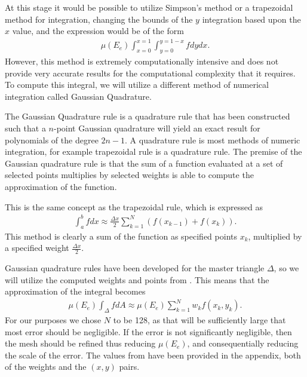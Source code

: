 \documentclass[../fem.tex]{subfile}
\begin{document}
At this stage it would be possible to utilize Simpson's method or a trapezoidal
method for integration, changing the bounds of the $y$ integration based upon
the $x$ value, and the expression would be of the form
\begin{align*}
  \mu\left(E_e\right)\int_{x=0}^{x=1}\int_{y=0}^{y=1-x}fdydx.
\end{align*}
However, this method is extremely computationally intensive and does not
provide very accurate results for the computational complexity that it
requires. To compute this integral, we will utilize a different method of
numerical integration called Gaussian Quadrature.

The Gaussian Quadrature rule is a quadrature rule that has been constructed
such that a $n$-point Gaussian quadrature will yield an exact result for
polynomials of the degree $2n-1$. A quadrature rule is most methods of numeric
integration, for example trapezoidal rule is a quadrature rule. The premise of
the Gaussian quadrature rule is that the sum of a function evaluated at a set
of selected points multiplies by selected weights is able to compute the
approximation of the function.

This is the same concept as the trapezoidal rule, which is expressed as
\begin{align*}
  \int_a^bfdx\approx\frac{\Delta
    x}{2}\sum_{k=1}^{N}\left(f(x_{k-1})+f(x_{k})\right).
\end{align*}
This method is clearly a sum of the function as specified points $x_k$, multiplied by
a specified weight $\frac{\Delta x}{2}$.

Gaussian quadrature rules have been developed for the master triangle $\Delta$,
so we will utilize the computed weights and points from \cite{GQ}. This means
that the approximation of the integral becomes
\begin{align*}
  \mu\left(E_e\right)\int_{\Delta}fdA\approx\mu\left(E_e\right)\sum_{k=1}^Nw_kf(x_k,y_k).
\end{align*}
For our purposes we chose $N$ to be 128, as that will be sufficiently large that
most error should be negligible. If the error is not significantly negligible,
then the mesh should be refined thus reducing $\mu\left(E_e\right)$, and
consequentially reducing the scale of the error. The values from \cite{GQ} have
been provided in the appendix, both of the weights and the $(x,y)$ pairs.
\end{document}
